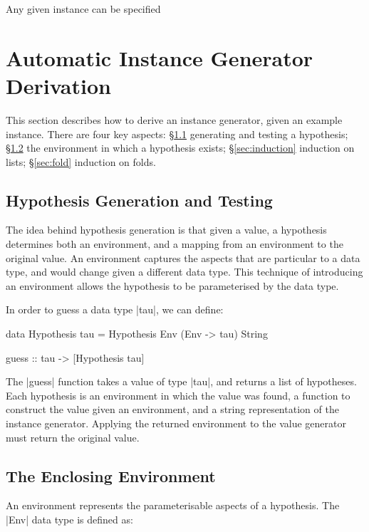 \documentclass{llncs}
\begin{document}
 Any given instance can be specified 



\section{Automatic Instance Generator Derivation}
\label{sec:automatic_instances}

This section describes how to derive an instance generator, given an example instance. There are four key aspects: \S\ref{sec:generation} generating and testing a hypothesis; \S\ref{sec:environment} the environment in which a hypothesis exists; \S\ref{sec:induction} induction on lists; \S\ref{sec:fold} induction on folds.

\subsection{Hypothesis Generation and Testing}
\label{sec:generation}

The idea behind hypothesis generation is that given a value, a hypothesis determines both an environment, and a mapping from an environment to the original value. An environment captures the aspects that are particular to a data type, and would change given a different data type. This technique of introducing an environment allows the hypothesis to be parameterised by the data type.

In order to guess a data type |tau|, we can define:

\begin{code}
data Hypothesis tau = Hypothesis Env (Env -> tau) String

guess :: tau -> [Hypothesis tau]
\end{code}

The |guess| function takes a value of type |tau|, and returns a list of hypotheses. Each hypothesis is an environment in which the value was found, a function to construct the value given an environment, and a string representation of the instance generator. Applying the returned environment to the value generator must return the original value.


\subsection{The Enclosing Environment}
\label{sec:environment}

An environment represents the parameterisable aspects of a hypothesis. The |Env| data type is defined as:
\end{document}
